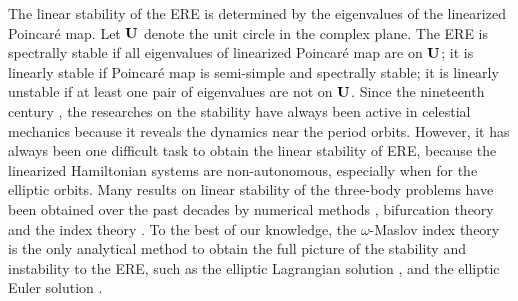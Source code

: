 \documentclass[11pt]{article}
\def\lb{\label}
\def\R{{\bf R}}
\def\U{{\bf U}}
\def\om{{\omega}}
\begin{document}


The linear stability of the ERE is determined by the eigenvalues of the linearized Poincar\'e map. 
Let $\U$ denote the unit circle in the complex plane. The ERE is spectrally stable if all eigenvalues of linearized Poincar\'e map  are on $\U$; it is linearly stable if Poincar\'e map is semi-simple and spectrally stable; it is linearly unstable if at least one pair of eigenvalues are not on $\U$.
Since the nineteenth century \cite{R2}, the researches on the stability have always been active in celestial mechanics because it reveals the dynamics near the period orbits. 
However, it has always been one difficult task to obtain the linear stability of ERE, because the linearized Hamiltonian systems are non-autonomous, especially when for the elliptic orbits.
Many results on linear stability of the three-body problems have been obtained over the past decades by numerical methods \cite{MSS,MSS1,MSS2}, bifurcation theory \cite{R1} and the index theory \cite{HS,HLS,HuOuWang2015ARMA,Zhou2017}.  
To the best of our knowledge, the $\om$-Maslov index theory is the only analytical method to obtain the full picture of the stability and instability to the ERE, such as the elliptic Lagrangian solution \cite{HS,HLS,HuOuWang2015ARMA}, and the elliptic Euler solution \cite{Zhou2017,ZhonLong2017CMDA}.
\end{document}
